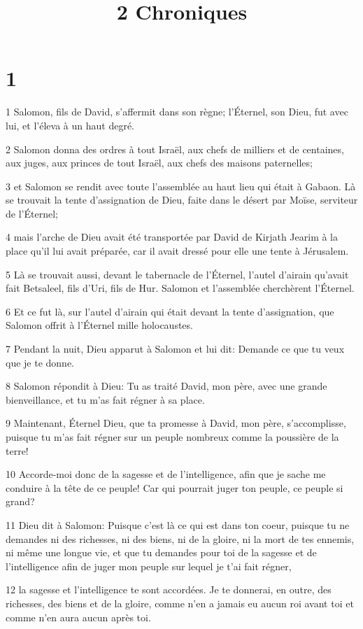 

\title{2 Chroniques}


\chapter{1}

\par 1 Salomon, fils de David, s'affermit dans son règne; l'Éternel, son Dieu, fut avec lui, et l'éleva à un haut degré.
\par 2 Salomon donna des ordres à tout Israël, aux chefs de milliers et de centaines, aux juges, aux princes de tout Israël, aux chefs des maisons paternelles;
\par 3 et Salomon se rendit avec toute l'assemblée au haut lieu qui était à Gabaon. Là se trouvait la tente d'assignation de Dieu, faite dans le désert par Moïse, serviteur de l'Éternel;
\par 4 mais l'arche de Dieu avait été transportée par David de Kirjath Jearim à la place qu'il lui avait préparée, car il avait dressé pour elle une tente à Jérusalem.
\par 5 Là se trouvait aussi, devant le tabernacle de l'Éternel, l'autel d'airain qu'avait fait Betsaleel, fils d'Uri, fils de Hur. Salomon et l'assemblée cherchèrent l'Éternel.
\par 6 Et ce fut là, sur l'autel d'airain qui était devant la tente d'assignation, que Salomon offrit à l'Éternel mille holocaustes.
\par 7 Pendant la nuit, Dieu apparut à Salomon et lui dit: Demande ce que tu veux que je te donne.
\par 8 Salomon répondit à Dieu: Tu as traité David, mon père, avec une grande bienveillance, et tu m'as fait régner à sa place.
\par 9 Maintenant, Éternel Dieu, que ta promesse à David, mon père, s'accomplisse, puisque tu m'as fait régner sur un peuple nombreux comme la poussière de la terre!
\par 10 Accorde-moi donc de la sagesse et de l'intelligence, afin que je sache me conduire à la tête de ce peuple! Car qui pourrait juger ton peuple, ce peuple si grand?
\par 11 Dieu dit à Salomon: Puisque c'est là ce qui est dans ton coeur, puisque tu ne demandes ni des richesses, ni des biens, ni de la gloire, ni la mort de tes ennemis, ni même une longue vie, et que tu demandes pour toi de la sagesse et de l'intelligence afin de juger mon peuple sur lequel je t'ai fait régner,
\par 12 la sagesse et l'intelligence te sont accordées. Je te donnerai, en outre, des richesses, des biens et de la gloire, comme n'en a jamais eu aucun roi avant toi et comme n'en aura aucun après toi.
